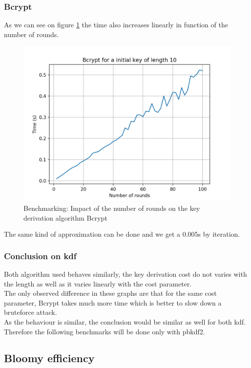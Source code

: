 \documentclass{eplmastersthesis}
\begin{document}
\subsubsection{Bcrypt}
As we can see on figure \ref{benchmarking:TimeBcrypt} the time also increases linearly in function of the number of rounds.
\begin{figure}[h!]
\begin{center}
	\includegraphics[scale=0.6]{res/TimeBcrypt}
	\caption{Benchmarking: Impact of the number of rounds on the key derivation algorithm Bcrypt}
	\label{benchmarking:TimeBcrypt}
\end{center}
\end{figure}
The same kind of approximation can be done and we get a 0.005s by iteration.
\subsubsection*{Conclusion on \gls{kdf}}
Both algorithm used behaves similarly, the key derivation cost do not varies with the length as well as it varies linearly with the cost parameter.\\
The only observed difference in these graphs are that for the same cost parameter, Bcrypt takes much more time which is better to slow down a bruteforce attack.\\
As the behaviour is similar, the conclusion would be similar as well for both \gls{kdf}. Therefore the following benchmarks will be done only with \gls{pbkdf2}.

\subsection{Bloomy efficiency}
\label{sec:BloomyEfficiency}
\end{document}
